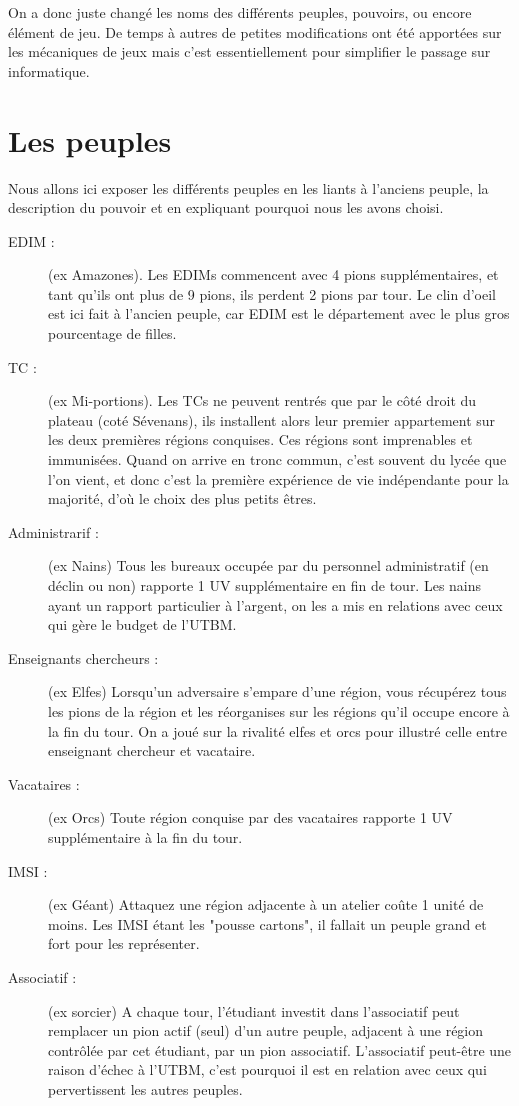 \documentclass[11pt]{report}
\begin{document}
	On a donc juste changé les noms des différents peuples, pouvoirs, ou encore élément de jeu. De temps à autres de petites modifications ont été apportées sur les mécaniques de jeux mais c'est essentiellement pour simplifier le passage sur informatique.    

	\section{Les peuples}
	
	Nous allons ici exposer les différents peuples en les liants à l'anciens peuple, la description du pouvoir et en expliquant pourquoi nous les avons choisi.
	
	\begin{description}
		\item[EDIM :] (ex Amazones). Les EDIMs commencent avec 4 pions supplémentaires, et tant qu'ils ont plus de 9 pions, ils perdent 2 pions par tour. Le clin d'oeil est ici fait à l'ancien peuple, car EDIM est le département avec le plus gros pourcentage de filles.
		\item[TC :] (ex Mi-portions). Les TCs ne peuvent rentrés que par le côté droit du plateau (coté Sévenans), ils installent alors leur premier appartement sur les deux premières régions conquises. Ces régions sont imprenables et immunisées. Quand on arrive en tronc commun, c'est souvent du lycée que l'on vient, et donc c'est la première expérience de vie indépendante pour la majorité, d'où le choix des plus petits êtres.
		\item[Administrarif :] (ex Nains) Tous les bureaux occupée par du personnel administratif (en déclin ou non) rapporte 1 UV supplémentaire en fin de tour. Les nains ayant un rapport particulier à l'argent, on les a mis en relations avec ceux qui gère le budget de l'UTBM.
		\item[Enseignants chercheurs :] (ex Elfes) Lorsqu'un adversaire s'empare d'une région, vous récupérez tous les pions de la région et les réorganises sur les régions qu'il occupe encore à la fin du tour. On a joué sur la rivalité elfes et orcs pour illustré celle entre enseignant chercheur et vacataire.
		\item[Vacataires :] (ex Orcs) Toute région conquise par des vacataires rapporte 1 UV supplémentaire à la fin du tour.
		\item[IMSI :] (ex Géant) Attaquez une région adjacente à un atelier coûte 1 unité de moins. Les IMSI étant les "pousse cartons", il fallait un peuple grand et fort pour les représenter.
		\item[Associatif :] (ex sorcier) A chaque tour, l'étudiant investit dans l'associatif peut remplacer un pion actif (seul) d'un autre peuple, adjacent à une région contrôlée par cet étudiant, par un pion associatif. L'associatif peut-être une raison d'échec à l'UTBM, c'est pourquoi il est en relation avec ceux qui pervertissent les autres peuples.

\end{description}
\end{document}
